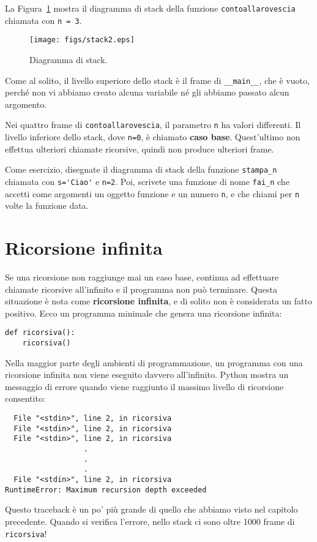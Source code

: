 \documentclass[10pt]{book}
\begin{document}
La Figura~\ref{fig.stack2} mostra il diagramma di stack della funzione {\tt contoallarovescia} chiamata con {\tt n = 3}.

\begin{figure}
\centerline
{\texttt{[image: figs/stack2.eps]}}
\caption{Diagramma di stack.}
\label{fig.stack2}
\end{figure}

Come al solito, il livello superiore dello stack è il frame di \verb"__main__", che
è vuoto, perché non vi abbiamo creato alcuna variabile né gli abbiamo passato alcun argomento.

Nei quattro frame di {\tt contoallarovescia}, il parametro {\tt n} ha valori differenti. Il livello inferiore dello stack, dove {\tt n=0}, è chiamato {\bf caso base}. Quest'ultimo non effettua ulteriori chiamate ricorsive, quindi non produce ulteriori frame.

Come esercizio, disegnate il diagramma di stack della funzione \verb"stampa_n" chiamata con \verb"s='Ciao'" e {\tt n=2}. Poi, scrivete una funzione di nome \verb"fai_n" che accetti come argomenti un oggetto funzione e un numero {\tt n}, e che chiami per {\tt n} volte la funzione data.


\section{Ricorsione infinita}


Se una ricorsione non raggiunge mai un caso base, continua ad effettuare chiamate ricorsive all'infinito e il programma non può terminare. Questa situazione è nota come {\bf ricorsione infinita}, e di solito non è considerata un fatto positivo.
Ecco un programma minimale che genera una ricorsione infinita:

\begin{verbatim}
def ricorsiva():
    ricorsiva()
\end{verbatim}
%
Nella maggior parte degli ambienti di programmazione, un programma con una ricorsione infinita non viene eseguito davvero all'infinito. Python mostra un messaggio di errore quando viene raggiunto il massimo livello di ricorsione consentito:

\begin{verbatim}
  File "<stdin>", line 2, in ricorsiva
  File "<stdin>", line 2, in ricorsiva
  File "<stdin>", line 2, in ricorsiva
                  .   
                  .
                  .
  File "<stdin>", line 2, in ricorsiva
RuntimeError: Maximum recursion depth exceeded
\end{verbatim}
%
Questo traceback è un po' più grande di quello che abbiamo visto nel capitolo precedente. Quando si verifica l'errore, nello stack ci sono oltre 1000 frame di {\tt ricorsiva}!
\end{document}
